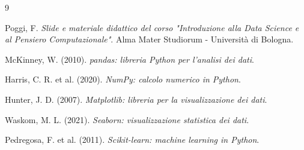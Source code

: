 \documentclass[11pt, a4paper]{article}
\begin{document}
\begin{thebibliography}{9}

Poggi, F. \textit{Slide e materiale didattico del corso "Introduzione alla Data Science e al Pensiero Computazionale"}. Alma Mater Studiorum - Università di Bologna.

McKinney, W. (2010). \textit{pandas: libreria Python per l'analisi dei dati}.

Harris, C. R. et al. (2020). \textit{NumPy: calcolo numerico in Python}.

Hunter, J. D. (2007). \textit{Matplotlib: libreria per la visualizzazione dei dati}.

Waskom, M. L. (2021). \textit{Seaborn: visualizzazione statistica dei dati}.

Pedregosa, F. et al. (2011). \textit{Scikit-learn: machine learning in Python}.

\end{thebibliography}
\end{document}

